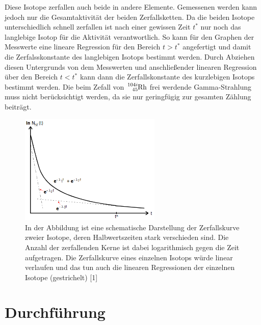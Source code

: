 \documentclass[titlepage = firstcover]{scrartcl}
\begin{document}
                \noindent
                Diese Isotope zerfallen auch beide in andere Elemente. Gemessenen werden kann jedoch nur die Gesamtaktivität der beiden Zerfallsketten. Da die beiden Isotope unterschiedlich schnell 
                zerfallen ist nach einer gewissen Zeit $t^*$ nur noch das langlebige Isotop für die Aktivität verantwortlich. So kann für den Graphen der Messwerte eine lineare Regression für den 
                Bereich $t>t^*$ angefertigt und damit die Zerfalsskonstante des langlebigen Isotops bestimmt werden. Durch Abziehen diesen Untergrunds von dem Messwerten und anschließender linearen 
                Regression über den Bereich $t<t^*$ kann dann die Zerfallskonstante des kurzlebigen Isotops bestimmt werden. Die beim Zefall von $\ce{^{104i}_{45}Rh}$ frei werdende Gamma-Strahlung
                muss nicht berücksichtigt werden, da sie nur geringfügig zur gesamten Zählung beiträgt. 

                \FloatBarrier

                \begin{figure}[h]
                  \centering
                  \includegraphics[width = 0.6\textwidth]{Bilder/RhSchema.png}
                  \caption{In der Abbildung ist eine schematische Darstellung der Zerfallskurve zweier Isotope, deren Halbwertszeiten stark verschieden sind. Die Anzahl der zerfallenden Kerne ist dabei logarithmisch gegen die Zeit aufgetragen. Die Zerfallskurve eines einzelnen Isotops würde linear verlaufen und das tun auch die linearen Regressionen der einzelnen Isotope (gestrichelt)  [1]}
                  \label{fig:RhSchema}
                \end{figure}

                \FloatBarrier

    \newpage
    \section{Durchführung}
\end{document}
